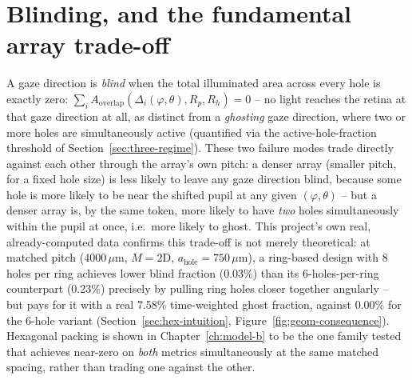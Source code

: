 \section{Blinding, and the fundamental array trade-off}
\label{sec:blinding}
A gaze direction is \emph{blind} when the total illuminated area across every hole is
exactly zero: $\sum_i A_{\mathrm{overlap}}(\Delta_i(\varphi,\theta),R_p,R_h)=0$ -- no
light reaches the retina at that gaze direction at all, as distinct from a
\emph{ghosting} gaze direction, where two or more holes are simultaneously active
(quantified via the active-hole-fraction threshold of Section~\ref{sec:three-regime}).
These two failure modes trade directly against each other through the array's own
pitch: a denser array (smaller pitch, for a fixed hole size) is less likely to leave any
gaze direction blind, because some hole is more likely to be near the shifted pupil at
any given $(\varphi,\theta)$ -- but a denser array is, by the same token, more likely to
have \emph{two} holes simultaneously within the pupil at once, i.e.\ more likely to
ghost. This project's own real, already-computed data confirms this trade-off is not
merely theoretical: at matched pitch (4000\,$\mu$m, $M=2$D, $a_{\mathrm{hole}}=750\,\mu$m),
a ring-based design with 8 holes per ring achieves lower blind fraction (0.03\%) than
its 6-holes-per-ring counterpart (0.23\%) precisely by pulling ring holes closer
together angularly -- but pays for it with a real 7.58\% time-weighted ghost fraction,
against 0.00\% for the 6-hole variant (Section~\ref{sec:hex-intuition},
Figure~\ref{fig:geom-consequence}). Hexagonal packing is shown in
Chapter~\ref{ch:model-b} to be the one family tested that achieves near-zero on
\emph{both} metrics simultaneously at the same matched spacing, rather than trading one
against the other.
